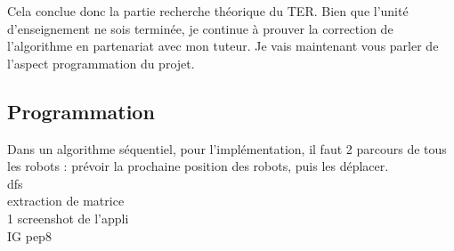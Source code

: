 Cela conclue donc la partie recherche théorique du TER. Bien que l'unité
d'enseignement ne sois terminée, je continue à prouver la correction de
l'algorithme en partenariat avec mon tuteur. Je vais maintenant vous parler de
l'aspect programmation du projet.

\subsection{Programmation}

Dans un algorithme séquentiel,
pour l'implémentation, il faut 2 parcours de tous les robots : prévoir la
prochaine position des robots, puis les déplacer. \\

dfs \\
extraction de matrice \\

1 screenshot de l'appli \\

IG
pep8
